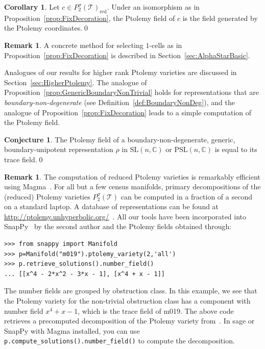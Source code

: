 \documentclass[12pt]{amsart}
\theoremstyle{definition}
\newtheorem{remark}[theorem]{Remark}
\newtheorem{corollary}[theorem]{Corollary}
\newtheorem{conjecture}[theorem]{Conjecture}
\numberwithin{equation}{section}
\def\SL{\mathrm{SL}}
\def\PSL{\mathrm{PSL}}
\def\C{\mathbb{C}}
\def\T{\mathcal{T}}
\def\rd{\mathrm{red}}
\begin{document}
\begin{corollary}
Let $c\in P^\sigma_2(\T)_\rd$. Under an isomorphism as in Proposition~\ref{prop:FixDecoration}, the Ptolemy field of $c$ is the field generated by the Ptolemy coordinates.\qed %
\end{corollary}
\begin{remark} 
A concrete method for selecting $1$-cells as in Proposition~\ref{prop:FixDecoration} is described in Section~\ref{sec:AlphaStarBasic}.
\end{remark}
Analogues of our results for higher rank Ptolemy varieties are discussed in Section~\ref{sec:HigherPtolemy}. The analogue of Proposition~\ref{prop:GenericBoundaryNonTrivial} holds for representations that are \emph{boundary-non-degenerate} (see Definition~\ref{def:BoundaryNonDeg}), and the analogue of Proposition~\ref{prop:FixDecoration} leads to a simple computation of the Ptolemy field. 
\begin{conjecture}
The Ptolemy field of a boundary-non-degenerate, generic, boundary-unipotent representation $\rho$ in $\SL(n,\C)$ or $\PSL(n,\C)$ is equal to its trace field.\qed
\end{conjecture}
\begin{remark}
The computation of reduced Ptolemy varieties is remarkably efficient using Magma~\cite{Magma}.
For all but a few census manifolds, primary decompositions of the (reduced) Ptolemy varieties $P^\sigma_2(\T)$ can be computed in a fraction of a second on a standard laptop. A database of representations can be found at \url{http://ptolemy.unhyperbolic.org/}~\cite{Unhyperbolic}.
All our tools have been incorporated into SnapPy~\cite{SnapPy} by the second author and the Ptolemy fields obtained through:

\begin{verbatim}
>>> from snappy import Manifold
>>> p=Manifold("m019").ptolemy_variety(2,'all')
>>> p.retrieve_solutions().number_field()
... [[x^4 - 2*x^2 - 3*x - 1], [x^4 + x - 1]]
 \end{verbatim}
 
The number fields are grouped by obstruction class. In this example, we see that the Ptolemy variety for the non-trivial obstruction class has a component with number field $x^4+x-1$, which is the trace field of m019. The above code retrieves a precomputed decomposition of the Ptolemy variety from~\cite{Unhyperbolic}.
In sage or SnapPy with Magma installed, you can use \texttt{p.compute\_solutions().number\_field()} to compute the decomposition.
\end{remark}
\end{document}

